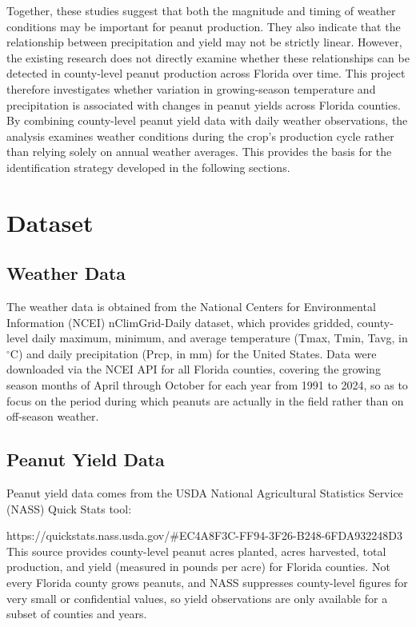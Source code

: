 \documentclass{article}
\begin{document}
Together, these studies suggest that both the magnitude and timing of weather conditions may be important for peanut production. They also indicate that the relationship between precipitation and yield may not be strictly linear. However, the existing research does not directly examine whether these relationships can be detected in county-level peanut production across Florida over time. This project therefore investigates whether variation in growing-season temperature and precipitation is associated with changes in peanut yields across Florida counties. By combining county-level peanut yield data with daily weather observations, the analysis examines weather conditions during the crop's production cycle rather than relying solely on annual weather averages. This provides the basis for the identification strategy developed in the following sections.

\section{Dataset}
\label{sec:dataset}

\subsection{Weather Data}

The weather data is obtained from the National Centers for Environmental Information (NCEI) nClimGrid-Daily dataset, which provides gridded, county-level daily maximum, minimum, and average temperature (Tmax, Tmin, Tavg, in $^\circ$C) and daily precipitation (Prcp, in mm) for the United States. Data were downloaded via the NCEI API for all Florida counties, covering the growing season months of April through October for each year from 1991 to 2024, so as to focus on the period during which peanuts are actually in the field rather than on off-season weather.

\subsection{Peanut Yield Data}

Peanut yield data comes from the USDA National Agricultural Statistics Service (NASS) Quick Stats tool:

https://quickstats.nass.usda.gov/\#EC4A8F3C-FF94-3F26-B248-6FDA932248D3
This source provides county-level peanut acres planted, acres harvested, total production, and yield (measured in pounds per acre) for Florida counties. Not every Florida county grows peanuts, and NASS suppresses county-level figures for very small or confidential values, so yield observations are only available for a subset of counties and years.
\end{document}
